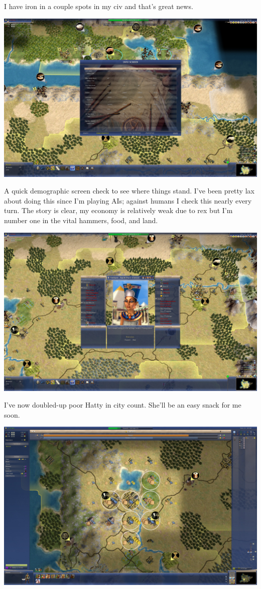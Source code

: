 \documentclass[10pt]{article}
\begin{document}
I have iron in a couple spots in my civ and that's great news.

\includegraphics[width=1.0\textwidth]{110}

A quick demographic screen check to see where things stand. I've been pretty lax about doing this since I'm playing AIs;
against humans I check this nearly every turn. The story is clear, my economy is relatively weak due to rex but I'm
number one in the vital hammers, food, and land.

\includegraphics[width=1.0\textwidth]{111}

I've now doubled-up poor Hatty in city count. She'll be an easy snack for me soon.

\includegraphics[width=1.0\textwidth]{115}
\end{document}
